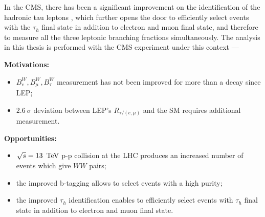 In the CMS, there has been a significant improvement on the identification of the hadronic tau leptons \cite{Chatrchyan:2012zz, Khachatryan:2015dfa, Sirunyan:2018pgf}, which further opens the door to efficiently select \ttbar events with the $\tau_h$ final state in addition to electron and muon final state, and therefore to measure all the three leptonic branching fractions simultaneously. The analysis in this thesis is performed with the CMS experiment under this context ---

    


    \noindent \textbf{Motivations:}
        \begin{itemize}
            \item $B^W_e, B^W_\mu ,B^W_\tau$ measurement has not been improved for more than a decay since LEP;
            \item $2.6~\sigma$ deviation between LEP's $R_{\tau/(e,\mu)}$ and the SM requires additional measurement.
        \end{itemize}
    
    \noindent \textbf{Opportunities:}
        \begin{itemize}
            \item $\sqrt{s}=13~\,\text{Te\hspace{-.08em}V}$ p-p collision at the LHC produces an increased number of \ttbar events which give $WW$ pairs;
            \item the improved b-tagging allows to select \ttbar events with a high purity;
            \item the improved $\tau_h$ identification enables to efficiently select \ttbar events with $\tau_h$ final state in addition to electron and muon final state.
        \end{itemize}

